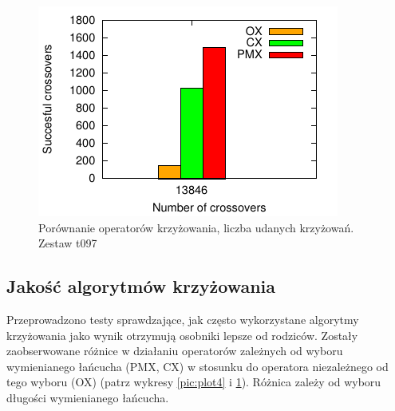 \documentclass[12pt]{article}
\begin{document}
\begin{figure}[t]
  \centering
  \includegraphics[scale=1.1]{plots/plot5.pdf}
  \caption{Porównanie operatorów krzyżowania, liczba udanych krzyżowań. Zestaw t097}
  \label{pic:plot5}
\end{figure}

\subsection{Jakość algorytmów krzyżowania}

Przeprowadzono testy sprawdzające, jak często wykorzystane algorytmy
krzyżowania jako wynik otrzymują osobniki lepsze od rodziców. Zostały
zaobserwowane różnice w działaniu operatorów zależnych od wyboru
wymienianego łańcucha (PMX, CX) w stosunku do operatora niezależnego
od tego wyboru (OX) (patrz wykresy \ref{pic:plot4} i \ref{pic:plot5}).
Różnica zależy od wyboru długości wymienianego łańcucha.
\end{document}

